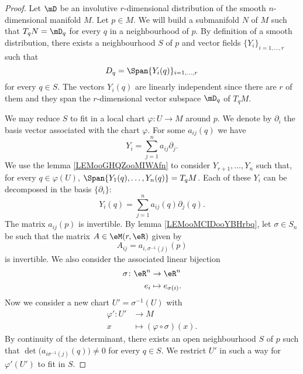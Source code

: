 \begin{proof}
	Let \( \mD\) be an involutive \( r\)-dimensional distribution of the smooth \( n\)-dimensional manifold \( M\). Let \( p\in M\). We will build a submanifold \( N\) of \( M\) such that \( T_qN=\mD_q\) for every \( q\) in a neighbourhood of \( p\). By definition of a smooth distribution, there exists a neighbourhood \( S\) of \( p\) and vector fields \( \{ Y_i \}_{i=1,\ldots, r}\) such that
	\begin{equation}
		D_q=\Span\{ Y_i(q) \}_{i=1,\ldots, r}
	\end{equation}
	for every \( q\in S\). The vectors \( Y_i(q)\) are linearly independent since there are \( r\) of them and they span the \( r\)-dimensional vector subspace \( \mD_q\) of \( T_qM\).

	We may reduce \( S\) to fit in a local chart \( \varphi\colon U\to M\) around \( p\). We denote by \( \partial_i\) the basis vector associated with the chart \( \varphi\). For some \( a_{ij}(q)\) we have
	\begin{equation}
		Y_i=\sum_{j=1}^na_{ij}\partial_j.
	\end{equation}
	We use the lemma \ref{LEMooGHQZooMIWAfn} to consider \( Y_{r+1},\ldots,  Y_n\) such that, for every \( q\in \varphi(U)\), \( \Span\{ Y_1(q),\ldots, Y_n(q) \}=T_qM\). Each of these \( Y_i\) can be decomposed in the basis \( \{ \partial_i \}\):
	\begin{equation}
		Y_i(q)=\sum_{j=1}^na_{ij}(q)\partial_j(q).
	\end{equation}
	The matrix \( a_{ij}(p)\) is invertible. By lemma \ref{LEMooMCIDooYBHrbq}, let \( \sigma\in S_n\) be such that the matrix \( A\in \eM(r,\eR)\) given by
	\begin{equation}
		A_{ij}=a_{i,\sigma^{-1}(j)}(p)
	\end{equation}
	is invertible. We also consider the associated linear bijection
	\begin{equation}
		\begin{aligned}
			\sigma\colon \eR^n & \to \eR^n              \\
			e_i                & \mapsto e_{\sigma(i)}.
		\end{aligned}
	\end{equation}
	Now we consider a new chart \( U'=\sigma^{-1}(U)\) with
	\begin{equation}
		\begin{aligned}
			\varphi'\colon U' & \to M                             \\
			x                 & \mapsto (\varphi\circ \sigma)(x).
		\end{aligned}
	\end{equation}
	By continuity of the determinant, there exists an open neighbourhood \( S\) of \( p\) such that \( \det\big( a_{i\sigma^{-1}(j)}(q) \big)\neq 0\) for every \( q\in S\). We restrict \( U'\) in such a way for \( \varphi'(U')\) to fit in \( S\).


\end{proof}
